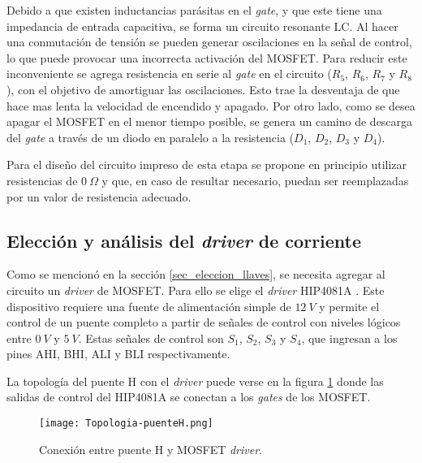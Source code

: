 
Debido a que existen inductancias parásitas en el \textsl{gate}, y que este tiene una impedancia de entrada capacitiva, se forma un circuito resonante LC. Al hacer una conmutación de tensión se pueden generar oscilaciones en la señal de control, lo que puede provocar una incorrecta activación del MOSFET. Para reducir este inconveniente se agrega resistencia en serie al \textsl{gate} en el circuito ($R_5$, $R_6$, $R_7$ y $R_8$), con el objetivo de amortiguar las oscilaciones. Esto trae la desventaja de que hace mas lenta la velocidad de encendido y apagado. Por otro lado, como se desea apagar el MOSFET en el menor tiempo posible, se genera un camino de descarga del \textsl{gate} a través de un diodo en paralelo a la resistencia ($D_1$, $D_2$, $D_3$ y $D_4$).

Para el diseño del circuito impreso de esta etapa se propone en principio utilizar resistencias de $0\:\Omega$ y que, en caso de resultar necesario, puedan ser reemplazadas por un valor de resistencia adecuado. 

\subsection{Elección y análisis del \textsl{driver} de corriente}

Como se mencionó en la sección \ref{sec_eleccion_llaves}, se necesita agregar al circuito un \textsl{driver} de MOSFET. Para ello se elige el \textsl{driver} HIP4081A \cite{HIP4081A_FN3659}. Este dispositivo requiere una fuente de alimentación simple de $12\:V$ y permite el control de un puente completo a partir de señales de control con niveles lógicos entre $0\:V$ y $5\:V$.  Estas señales de control  son $S_1$, $S_2$, $S_3$ y $S_4$, que ingresan  a los pines AHI, BHI, ALI y BLI respectivamente.

La topología del puente H con el \textsl{driver} puede verse en la figura \ref{fig:img_topologia-puenteH} donde las salidas de control del HIP4081A se conectan a los \textsl{gates} de los MOSFET.

\begin{figure}[H]
	\centering
	\texttt{[image: Topologia-puenteH.png]}
	\caption{Conexión entre puente H y MOSFET \textsl{driver}.}
	\label{fig:img_topologia-puenteH}
\end{figure}


